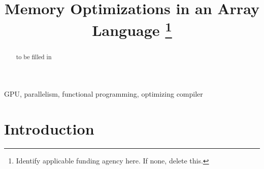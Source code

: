 \documentclass[conference]{IEEEtran}
\begin{document}
\title{Memory Optimizations in an Array Language %
\thanks{Identify applicable funding agency here. If none, delete this.}
}

\author{
  \and
  \and
  \and
}


\maketitle

\begin{abstract}
to be filled in
\end{abstract}

\begin{IEEEkeywords}
GPU, parallelism, functional programming, optimizing compiler
\end{IEEEkeywords}

\section{Introduction}
\label{sec:introduction}
\end{document}
